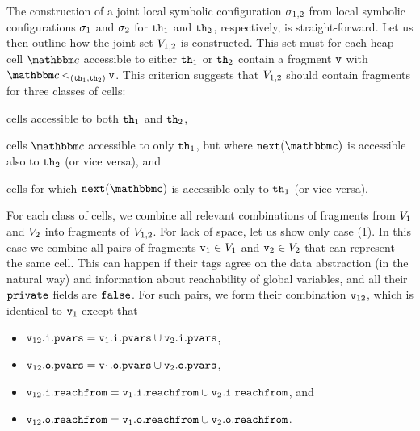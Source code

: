 The construction of a joint local symbolic configuration $\sigma_{1,2}$ from
local symbolic configurations 
$\sigma_1$ and $\sigma_2$ for ${\tt th}_1$ and ${\tt th}_2$,
respectively, is straight-forward.
Let us then outline how the joint set $V_{1,2}$ is constructed.
This set must for each
heap cell $\cell$ accessible to either ${\tt th}_1$ or ${\tt th}_2$ 
contain a fragment $\mathtt{v}$ with $\cell \satfrag{(\thread_1,\thread_2)} \frag$.
This criterion suggests that $V_{1,2}$ should contain fragments for
three classes of cells:
\begin{inparaenum}[(1)]
\item cells accessible to both ${\tt th}_1$ and ${\tt th}_2$,
\item cells $\cell$ accessible to only ${\tt th}_1$, but where
  $\tt next(\cell)$ is accessible also to ${\tt th}_2$
  (or vice versa), and
\item cells for which $\tt next(\cell)$ is accessible only to ${\tt th}_1$
  (or vice versa).
\end{inparaenum}
For each class of cells, we combine all relevant combinations of
fragments from $V_1$ and $V_2$ into fragments of $V_{1,2}$.
For lack of space, let us show only case (1).
In this case we combine all pairs of
fragments $\mathtt{v}_1 \in V_1$ and $\mathtt{v}_2 \in V_2$
that can represent the same cell.
This can happen if their
tags agree on the data abstraction (in the natural way)
and information about reachability of global variables,
and all their $\mathtt{private}$ fields are ${\tt false}$. For such pairs,
we form their combination $\mathtt{v}_{12}$,
which is identical to $\mathtt{v}_1$ except that 
\begin{itemize}
  \item $\mathtt{v}_{12}.\mathtt{i}.\mathtt{pvars} = \mathtt{v}_1.\mathtt{i}.\mathtt{pvars} \cup \mathtt{v}_2.\mathtt{i}.\mathtt{pvars}$,
  \item  $\mathtt{v}_{12}.\mathtt{o}.\mathtt{pvars} = \mathtt{v}_1.\mathtt{o}.\mathtt{pvars} \cup \mathtt{v}_2.\mathtt{o}.\mathtt{pvars}$,
  \item $\mathtt{v}_{12}.\mathtt{i}.\mathtt{reachfrom} = \mathtt{v}_{1}.\mathtt{i}.\mathtt{reachfrom} \cup \mathtt{v}_{2}.\mathtt{i}.\mathtt{reachfrom}$, and
  \item $\mathtt{v}_{12}.\mathtt{o}.\mathtt{reachfrom} = \mathtt{v}_{1}.\mathtt{o}.\mathtt{reachfrom} \cup \mathtt{v}_{2}.\mathtt{o}.\mathtt{reachfrom}$.
\end{itemize}

